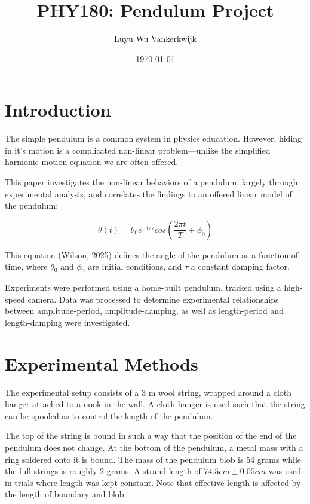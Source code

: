 \documentclass[prl,twocolumn,amsmath,amssymb,superscriptaddress]{revtex4-2}
\begin{document}
\title{PHY180: Pendulum Project}
\author{Luyu Wu Vankerkwijk}
\date{\today}


\maketitle

\section{Introduction}
The simple pendulum is a common system in physics education. However, hiding in it's motion is a complicated non-linear problem---unlike the simplified harmonic motion equation we are often offered.

This paper investigates the non-linear behaviors of a pendulum, largely through experimental analysis, and correlates the findings to an offered linear model of the pendulum:

\begin{equation}
    \theta(t) = \theta_0e^{-t/\tau}cos\left(\frac{2\pi t}{T}+\phi_0\right)
\end{equation}

This equation (Wilson, 2025) defines the angle of the pendulum as a function of time, where $\theta_0$ and $\phi_0$ are initial conditions, and $\tau$ a constant damping factor.


Experiments were performed using a home-built pendulum, tracked using a high-speed camera. Data was processed to determine experimental relationships between amplitude-period, amplitude-damping, as well as length-period and length-damping were investigated.

\section{Experimental Methods}
The experimental setup consists of a 3 m wool string, wrapped around a cloth hanger attached to a nook in the wall. A cloth hanger is used such that the string can be spooled as to control the length of the pendulum.

The top of the string is bound in such a way that the position of the end of the pendulum does not change. At the bottom of the pendulum, a metal mass with a ring soldered onto it is bound. The mass of the pendulum blob is 54 grams while the full strings is roughly 2 grams. A strand length of $74.5 cm \pm 0.05 cm$ was used in trials where length was kept constant. Note that effective length is affected by the length of boundary and blob.
\end{document}
